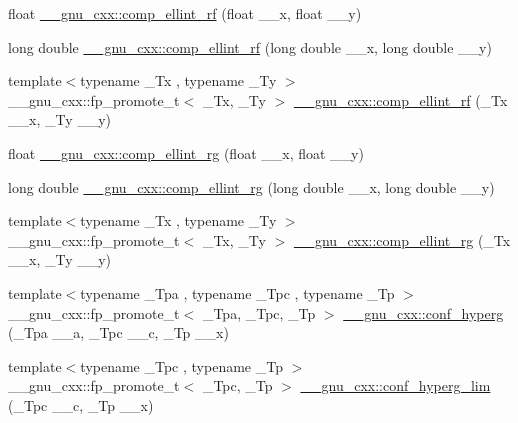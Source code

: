 \begin{DoxyCompactItemize}
\item 
float \hyperlink{group__gnu__math__spec__func_ga55ae30b4f8ff15017d18a80050e14e38}{\+\_\+\+\_\+gnu\+\_\+cxx\+::comp\+\_\+ellint\+\_\+rf} (float \+\_\+\+\_\+x, float \+\_\+\+\_\+y)
\item 
long double \hyperlink{group__gnu__math__spec__func_gae1d468487f1711e91719a9c6392f3c35}{\+\_\+\+\_\+gnu\+\_\+cxx\+::comp\+\_\+ellint\+\_\+rf} (long double \+\_\+\+\_\+x, long double \+\_\+\+\_\+y)
\item 
{\footnotesize template$<$typename \+\_\+\+Tx , typename \+\_\+\+Ty $>$ }\\\+\_\+\+\_\+gnu\+\_\+cxx\+::fp\+\_\+promote\+\_\+t$<$ \+\_\+\+Tx, \+\_\+\+Ty $>$ \hyperlink{group__gnu__math__spec__func_gaf6450c88127cf771acfc0667914266d1}{\+\_\+\+\_\+gnu\+\_\+cxx\+::comp\+\_\+ellint\+\_\+rf} (\+\_\+\+Tx \+\_\+\+\_\+x, \+\_\+\+Ty \+\_\+\+\_\+y)
\item 
float \hyperlink{group__gnu__math__spec__func_ga978f8eec6e5edc918b243925dbacb65b}{\+\_\+\+\_\+gnu\+\_\+cxx\+::comp\+\_\+ellint\+\_\+rg} (float \+\_\+\+\_\+x, float \+\_\+\+\_\+y)
\item 
long double \hyperlink{group__gnu__math__spec__func_gaca5fa8ee8125afc8f35ec6b27806e873}{\+\_\+\+\_\+gnu\+\_\+cxx\+::comp\+\_\+ellint\+\_\+rg} (long double \+\_\+\+\_\+x, long double \+\_\+\+\_\+y)
\item 
{\footnotesize template$<$typename \+\_\+\+Tx , typename \+\_\+\+Ty $>$ }\\\+\_\+\+\_\+gnu\+\_\+cxx\+::fp\+\_\+promote\+\_\+t$<$ \+\_\+\+Tx, \+\_\+\+Ty $>$ \hyperlink{group__gnu__math__spec__func_ga389b1ef6cad1e33c1120665a4b915642}{\+\_\+\+\_\+gnu\+\_\+cxx\+::comp\+\_\+ellint\+\_\+rg} (\+\_\+\+Tx \+\_\+\+\_\+x, \+\_\+\+Ty \+\_\+\+\_\+y)
\item 
{\footnotesize template$<$typename \+\_\+\+Tpa , typename \+\_\+\+Tpc , typename \+\_\+\+Tp $>$ }\\\+\_\+\+\_\+gnu\+\_\+cxx\+::fp\+\_\+promote\+\_\+t$<$ \+\_\+\+Tpa, \+\_\+\+Tpc, \+\_\+\+Tp $>$ \hyperlink{group__gnu__math__spec__func_ga4d01e85e7d295afca5d9f8b6c68f19cc}{\+\_\+\+\_\+gnu\+\_\+cxx\+::conf\+\_\+hyperg} (\+\_\+\+Tpa \+\_\+\+\_\+a, \+\_\+\+Tpc \+\_\+\+\_\+c, \+\_\+\+Tp \+\_\+\+\_\+x)
\item 
{\footnotesize template$<$typename \+\_\+\+Tpc , typename \+\_\+\+Tp $>$ }\\\+\_\+\+\_\+gnu\+\_\+cxx\+::fp\+\_\+promote\+\_\+t$<$ \+\_\+\+Tpc, \+\_\+\+Tp $>$ \hyperlink{group__gnu__math__spec__func_ga9fe7a5e2e741f56d88fd29bc249feab2}{\+\_\+\+\_\+gnu\+\_\+cxx\+::conf\+\_\+hyperg\+\_\+lim} (\+\_\+\+Tpc \+\_\+\+\_\+c, \+\_\+\+Tp \+\_\+\+\_\+x)

\end{DoxyCompactItemize}
